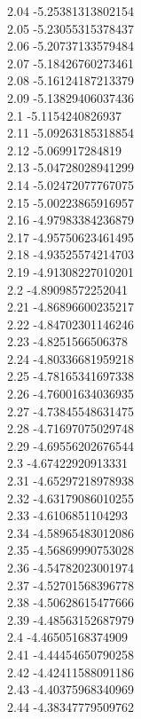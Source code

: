 {2.04	-5.25381313802154\\
2.05	-5.23055315378437\\
2.06	-5.20737133579484\\
2.07	-5.18426760273461\\
2.08	-5.16124187213379\\
2.09	-5.13829406037436\\
2.1	-5.1154240826937\\
2.11	-5.09263185318854\\
2.12	-5.069917284819\\
2.13	-5.04728028941299\\
2.14	-5.02472077767075\\
2.15	-5.00223865916957\\
2.16	-4.97983384236879\\
2.17	-4.95750623461495\\
2.18	-4.93525574214703\\
2.19	-4.91308227010201\\
2.2	-4.89098572252041\\
2.21	-4.86896600235217\\
2.22	-4.84702301146246\\
2.23	-4.8251566506378\\
2.24	-4.80336681959218\\
2.25	-4.78165341697338\\
2.26	-4.76001634036935\\
2.27	-4.73845548631475\\
2.28	-4.71697075029748\\
2.29	-4.69556202676544\\
2.3	-4.67422920913331\\
2.31	-4.65297218978938\\
2.32	-4.63179086010255\\
2.33	-4.6106851104293\\
2.34	-4.58965483012086\\
2.35	-4.56869990753028\\
2.36	-4.54782023001974\\
2.37	-4.52701568396778\\
2.38	-4.50628615477666\\
2.39	-4.48563152687979\\
2.4	-4.46505168374909\\
2.41	-4.44454650790258\\
2.42	-4.42411588091186\\
2.43	-4.40375968340969\\
2.44	-4.38347779509762\\
}
